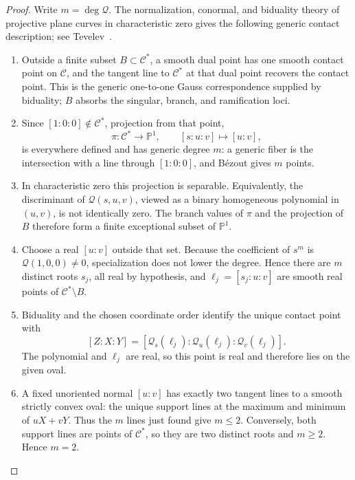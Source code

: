 \documentclass[preprints,article,submit,oneauthor]{Definitions/mdpi}
\numberwithin{equation}{section}
\begin{document}
\begin{proof}
Write \(m=\deg\mathscr Q\).  The normalization, conormal, and biduality theory
of projective plane curves in characteristic zero gives the following generic
contact description; see Tevelev~\cite{Tevelev2003}.
\begin{enumerate}
\item Outside a finite subset \(B\subset\mathscr C^*\), a smooth dual point
has one smooth contact point on \(\mathscr C\), and the tangent line to
\(\mathscr C^*\) at that dual point recovers the contact point.  This is the
generic one-to-one Gauss correspondence supplied by biduality; \(B\) absorbs
the singular, branch, and ramification loci.
\item Since \([1:0:0]\notin\mathscr C^*\), projection from that point,
\[
 \pi:\mathscr C^*\longrightarrow\mathbb P^1,
 \qquad [s:u:v]\longmapsto[u:v],
\]
is everywhere defined and has generic degree \(m\): a generic fiber is the
intersection with a line through \([1:0:0]\), and B\'ezout gives \(m\) points.
\item In characteristic zero this projection is separable.  Equivalently, the
discriminant of \(\mathscr Q(s,u,v)\), viewed as a binary homogeneous
polynomial in \((u,v)\), is not identically zero.  The branch values of \(\pi\)
and the projection of \(B\) therefore form a finite exceptional subset of
\(\mathbb P^1\).
\item Choose a real \([u:v]\) outside that set.  Because the coefficient of
\(s^m\) is \(\mathscr Q(1,0,0)\neq0\), specialization does not lower the
degree.  Hence there are \(m\) distinct roots \(s_j\), all real by hypothesis,
and \(\ell_j=[s_j:u:v]\) are smooth real points of \(\mathscr C^*\setminus B\).
\item Biduality and the chosen coordinate order identify the unique contact
point with
\[
 [Z:X:Y]=
 [\mathscr Q_s(\ell_j):\mathscr Q_u(\ell_j):
   \mathscr Q_v(\ell_j)].
\]
The polynomial and \(\ell_j\) are real, so this point is real and therefore
lies on the given oval.
\item A fixed unoriented normal \([u:v]\) has exactly two tangent lines to a
smooth strictly convex oval: the unique support lines at the maximum and
minimum of \(uX+vY\).  Thus the \(m\) lines just found give \(m\leq2\).
Conversely, both support lines are points of \(\mathscr C^*\), so they are two
distinct roots and \(m\geq2\).  Hence \(m=2\).
\end{enumerate}
\end{proof}
\end{document}
